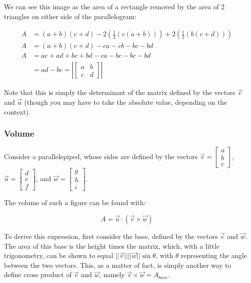 \documentclass[12pt]{article}
\begin{document}
We can see this image as the area of a rectangle removed by the area of 2 triangles on either side of the parallelogram:

\begin{equation}
    \begin{split}
    A &= (a+b)(c+d) - 2 (\frac{1}{2}(c(a+b))) + 2(\frac{1}{2}(b(c+d)))\\
    A &= (a+b)(c+d) - ca - cb - bc - bd\\
    A &= ac + ad + bc + bd - ca - bc - bc - bd\\
    &= ad - bc = |\begin{bmatrix}
        a & b\\
        c & d
        \end{bmatrix}|
    \end{split}
\end{equation}

Note that this is simply the determinant of the matrix defined by the vectors $\vec{v}$ and $\vec{u}$ (though you may have to take the absolute value, depending on the context).

\subsubsection{Volume}

Consider a parallelepiped, whose sides are defined by the vectors $\vec{v} = \begin{bmatrix}
    a\\
    b\\
    c
\end{bmatrix}$, $\vec{u} = \begin{bmatrix}
    d\\
    e\\
    f
\end{bmatrix}$, and $\vec{w} = \begin{bmatrix}
    g\\
    h\\
    i
\end{bmatrix}$.

The volume of such a figure can be found with:

\[
    A = \vec{u} \cdot (\vec{v}\times \vec{w})
    \]

To derive this expression, first consider the base, defined by the vectors $\vec{v}$ and $\vec{w}$. The area of this base is the height times the matrix, which, with a little trigonometry, can be shown to equal $||\vec{v}||||\vec{w}||\sin \theta$, with $\theta$ representing the angle between the two vectors. This, as a matter of fact, is simply another way to define cross product of $\vec{v}$ and $\vec{w}$, namely $\vec{v}\times\vec{w} = A_{base}$.
\end{document}
